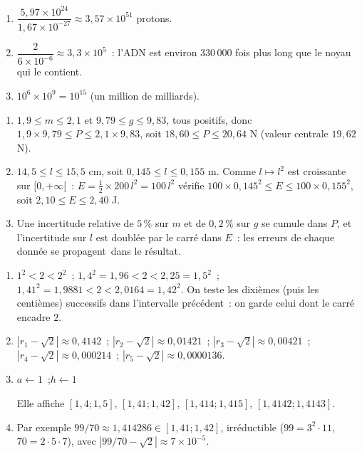 \begin{enumerate}
  \item $\dfrac{5{,}97\times10^{24}}{1{,}67\times10^{-27}}\approx3{,}57\times10^{51}$ protons.
  \item $\dfrac{2}{6\times10^{-6}}\approx3{,}3\times10^{5}$~: l'ADN est environ $330\,000$ fois plus long que le noyau qui le contient.
  \item $10^{6}\times10^{9}=10^{15}$ (un million de milliards).
\end{enumerate}
\begin{enumerate}
  \item $1{,}9\le m\le2{,}1$ et $9{,}79\le g\le9{,}83$, tous positifs, donc
        $1{,}9\times9{,}79\le P\le2{,}1\times9{,}83$, soit $18{,}60\le P\le20{,}64$ N (valeur centrale $19{,}62$ N).
  \item $14{,}5\le l\le15{,}5$ cm, soit $0{,}145\le l\le0{,}155$ m. Comme $l\mapsto l^2$ est croissante sur $[0,+\infty[$~:
        $E=\tfrac12\times200\,l^2=100\,l^2$ v\'erifie $100\times0{,}145^2\le E\le100\times0{,}155^2$,
        soit $2{,}10\le E\le2{,}40$ J.
  \item Une incertitude relative de $5\,\%$ sur $m$ et de $0{,}2\,\%$ sur $g$ se cumule dans $P$, et l'incertitude sur $l$ est doubl\'ee par le carr\'e dans $E$~: les erreurs de chaque donn\'ee se \og propagent\fg\ dans le r\'esultat.
\end{enumerate}
\begin{enumerate}
  \item $1^2<2<2^2$~; $1{,}4^2=1{,}96<2<2{,}25=1{,}5^2$~; $1{,}41^2=1{,}9881<2<2{,}0164=1{,}42^2$.
        On teste les dixi\`emes (puis les centi\`emes) successifs dans l'intervalle pr\'ec\'edent~: on garde celui dont le carr\'e encadre $2$.
  \item $|r_1-\sqrt2|\approx0{,}4142$~; $|r_2-\sqrt2|\approx0{,}01421$~; $|r_3-\sqrt2|\approx0{,}00421$~;
        $|r_4-\sqrt2|\approx0{,}000214$~; $|r_5-\sqrt2|\approx0{,}0000136$.
  \item \begin{algorithm}[H]
\caption{Raffinement par dixi\`emes}
$a\leftarrow1$~;\quad $h\leftarrow1$\;
\end{algorithm}
        Elle affiche $[1{,}4;1{,}5]$, $[1{,}41;1{,}42]$, $[1{,}414;1{,}415]$, $[1{,}4142;1{,}4143]$.
  \item Par exemple $99/70\approx1{,}414286\in[1{,}41;1{,}42]$, irr\'eductible ($99=3^2\cdot11$, $70=2\cdot5\cdot7$),
        avec $|99/70-\sqrt2|\approx7\times10^{-5}$.
\end{enumerate}
